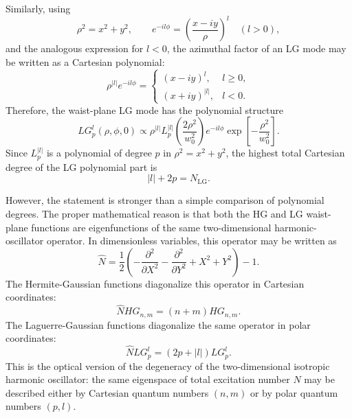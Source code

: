 \begin{resolucao}[Solution]
Similarly, using
\begin{equation}
    \rho^2=x^2+y^2,
    \qquad
    e^{-il\phi}
    =
    \left(
        \frac{x-iy}{\rho}
    \right)^l
    \quad
    (l>0),
    \label{eq:polar_cartesian_relation}
\end{equation}
and the analogous expression for $l<0$, the azimuthal factor of an LG mode may be written as a Cartesian polynomial:
\begin{equation}
    \rho^{|l|}e^{-il\phi}
    =
    \begin{cases}
        (x-iy)^l, & l\geq 0,\\[4pt]
        (x+iy)^{|l|}, & l<0.
    \end{cases}
    \label{eq:azimuthal_polynomial}
\end{equation}
Therefore, the waist-plane LG mode has the polynomial structure
\begin{equation}
    LG_p^l(\rho,\phi,0)
    \propto
    \rho^{|l|}
    L_p^{|l|}
    \left(
        \frac{2\rho^2}{w_0^2}
    \right)
    e^{-il\phi}
    \exp\left[
        -\frac{\rho^2}{w_0^2}
    \right].
    \label{eq:LG_waist_polynomial}
\end{equation}
Since $L_p^{|l|}$ is a polynomial of degree $p$ in $\rho^2=x^2+y^2$, the highest total Cartesian degree of the LG polynomial part is
\begin{equation}
    |l|+2p=N_{\mathrm{LG}}.
    \label{eq:LG_polynomial_order}
\end{equation}

However, the statement is stronger than a simple comparison of polynomial degrees. The proper mathematical reason is that both the HG and LG waist-plane functions are eigenfunctions of the same two-dimensional harmonic-oscillator operator. In dimensionless variables, this operator may be written as
\begin{equation}
    \hat{N}
    =
    \frac{1}{2}
    \left(
        -\frac{\partial^2}{\partial X^2}
        -\frac{\partial^2}{\partial Y^2}
        +X^2+Y^2
    \right)
    -1.
    \label{eq:number_operator_2d}
\end{equation}
The Hermite-Gaussian functions diagonalize this operator in Cartesian coordinates:
\begin{equation}
    \hat{N}
    HG_{n,m}
    =
    (n+m)
    HG_{n,m}.
    \label{eq:HG_number_eigenvalue}
\end{equation}
The Laguerre-Gaussian functions diagonalize the same operator in polar coordinates:
\begin{equation}
    \hat{N}
    LG_p^l
    =
    (2p+|l|)
    LG_p^l.
    \label{eq:LG_number_eigenvalue}
\end{equation}
This is the optical version of the degeneracy of the two-dimensional isotropic harmonic oscillator: the same eigenspace of total excitation number $N$ may be described either by Cartesian quantum numbers $(n,m)$ or by polar quantum numbers $(p,l)$.


\end{resolucao}
